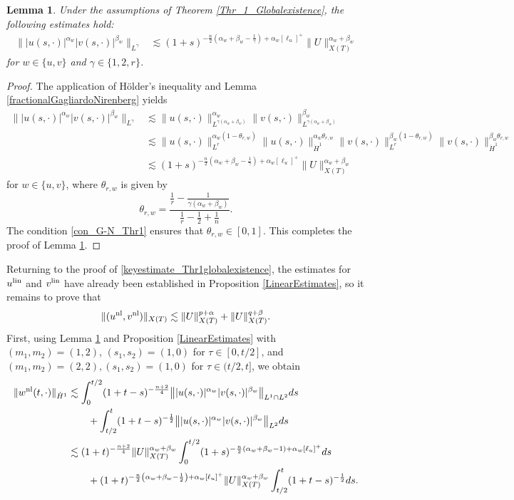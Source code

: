 \documentclass[11pt,reqno]{amsart}
\newtheorem{lemma}{Lemma}[section]
\newcommand{\tron}[1]{\left(#1\right)}
\begin{document}
	\begin{lemma}\label{lemma_G-N_Thr1globalexistence}
		Under the assumptions of Theorem \ref{Thr_1_Globalexistence}, the following estimates hold:
		\begin{align*}
			\big\||u(s,\cdot)|^{\alpha_w}|v(s,\cdot)|^{\beta_w}\big\|_{L^{\gamma}} &\lesssim  (1+s)^{-\frac{n}{2}(\alpha_w+\beta_w-\frac{1}{\gamma})+\alpha_w[\ell_u]^+} \|U\|_{X(T)}^{\alpha_w+\beta_w}
		\end{align*}
		for $w\in\{u,v\}$ and $\gamma\in \{1,2,r\}$.
	\end{lemma}
	\begin{proof}
		The application of H\"older's inequality and Lemma \ref{fractionalGagliardoNirenberg} yields
		\begin{align*}
			\big\||u(s,\cdot)|^{\alpha_w}|v(s,\cdot)|^{\beta_w}\big\|_{L^{\gamma}}
			&\lesssim \|u(s,\cdot)\|^{\alpha_w}_{L^{\gamma(\alpha_w+\beta_w)}}\|v(s,\cdot)\|^{\beta_w}_{L^{\gamma(\alpha_w+\beta_w)}} \\
			&\lesssim \|u(s,\cdot)\|^{\alpha_w(1-\theta_{r,w})}_{L^{r}}\|u(s,\cdot)\|^{\alpha_w\theta_{r,w}}_{\dot{H}^1}\|v(s,\cdot)\|_{L^{r}}^{\beta_w(1-\theta_{r,w})} \|v(s,\cdot)\|_{\dot{H}^{1}}^{\beta_w\theta_{r,w}}  \\
			&\lesssim (1+s)^{-\frac{n}{2}\tron{\alpha_w+\beta_w-\frac{1}{\gamma}}+\alpha_w[\ell_u]^+}  \|U\|_{X(T)}^{\alpha_w+\beta_w}
		\end{align*}
		for $w\in\{u,v\}$, where $\theta_{r,w}$ is given by
		\[
		\theta_{r,w}=\frac{\frac{1}{r}-\frac{1}{\gamma(\alpha_w+\beta_w)}}{\frac{1}{r}-\frac{1}{2}+\frac{1}{n}}.
		\]
		The condition \eqref{con_G-N_Thr1} ensures that $\theta_{r,w}\in[0,1]$. This completes the proof of Lemma \ref{lemma_G-N_Thr1globalexistence}.
	\end{proof}
	\noindent Returning to the proof of \eqref{keyestimate_Thr1globalexistence}, the estimates for $u^{\rm lin}$ and $v^{\rm lin}$ have already been established in Proposition \ref{LinearEstimates}, so it remains to prove that
	\begin{equation}\label{eqNu_Thr1}
		\|(u^{\rm nl},v^{\rm nl})\|_{X(T)}\lesssim \|U\|_{X(T)}^{p+\alpha}+ \|U\|_{X(T)}^{q+\beta}.
	\end{equation}
	First, using Lemma \ref{lemma_G-N_Thr1globalexistence} and
	Proposition \ref{LinearEstimates} with $(m_1,m_2) = (1,2)$, $(s_1, s_2) =(1,0)$ for $\tau \in [0, t/2]$, and $(m_1,m_2)=(2,2), (s_1,s_2) =(1,0)$ for $\tau \in (t/2,t]$, we obtain
	\begin{align*}
		\| w^{\rm nl}(t,\cdot)\|_{\dot{H}^1} &\lesssim \int_0^{t/2} (1+t-s)^{-\frac{n+2}{4}} \big\||u(s,\cdot)|^{\alpha_w}|v(s,\cdot)|^{\beta_w}\big\|_{L^1\cap L^2}ds\\
		&\qquad + \int_{t/2}^t (1+t-s)^{-\frac{1}{2}} \big\||u(s,\cdot)|^{\alpha_w}|v(s,\cdot)|^{\beta_w}\big\|_{L^2}ds\\
		&\lesssim  (1+t)^{-\frac{n+2}{4}} \|U\|_{X(T)}^{\alpha_w+\beta_w} \int_0^{t/2}(1+s)^{-\frac{n}{2}\tron{\alpha_w+\beta_w-1}+\alpha_w[\ell_u]^+}ds\\
		&\qquad +  (1+t)^{-\frac{n}{2}\tron{\alpha_w+\beta_w-\frac{1}{2}}+\alpha_w[\ell_u]^+} \|U\|_{X(T)}^{\alpha_w+\beta_w} \int_{t/2}^t (1+t-s)^{-\frac{1}{2}}ds.
	\end{align*}
\end{document}
